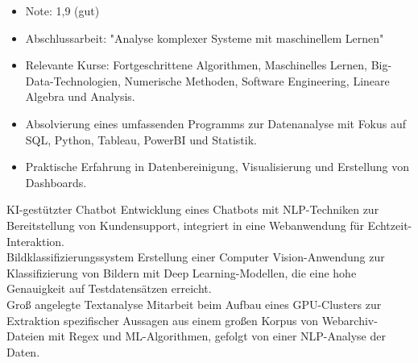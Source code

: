 \documentclass[9pt,a4paper,ragged2e,withhyper]{altacv}
\begin{document}
\begin{paracol}{2}
            \begin{itemize}
                \item Note: 1,9 (gut)
                \item Abschlussarbeit: "Analyse komplexer Systeme mit maschinellem Lernen"
                \item Relevante Kurse: Fortgeschrittene Algorithmen, Maschinelles Lernen, Big-Data-Technologien, Numerische Methoden, Software Engineering, Lineare Algebra und Analysis.
            \end{itemize}
            \vspace{0.5em}
            \begin{itemize}
                \item Absolvierung eines umfassenden Programms zur Datenanalyse mit Fokus auf SQL, Python, Tableau, PowerBI und Statistik.
                \item Praktische Erfahrung in Datenbereinigung, Visualisierung und Erstellung von Dashboards.
            \end{itemize}
            \vspace{0.5em}
        
        \cvevent
            { KI-gestützter Chatbot }
            {  }
            {}
            {}
        Entwicklung eines Chatbots mit NLP-Techniken zur Bereitstellung von Kundensupport, integriert in eine Webanwendung für Echtzeit-Interaktion.\\
        \vspace{0.5em}
        \cvevent
            { Bildklassifizierungssystem }
            {  }
            {}
            {}
        Erstellung einer Computer Vision-Anwendung zur Klassifizierung von Bildern mit Deep Learning-Modellen, die eine hohe Genauigkeit auf Testdatensätzen erreicht.\\
        \vspace{0.5em}
        \cvevent
            { Groß angelegte Textanalyse }
            {  }
            {}
            {}
        Mitarbeit beim Aufbau eines GPU-Clusters zur Extraktion spezifischer Aussagen aus einem großen Korpus von Webarchiv-Dateien mit Regex und ML-Algorithmen, gefolgt von einer NLP-Analyse der Daten.\\
        \vspace{0.5em}

        
    \end{paracol}
\end{document}
